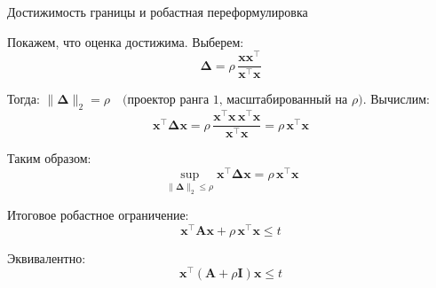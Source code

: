 \documentclass{beamer}
\begin{document}
\begin{frame}{Достижимость границы и робастная переформулировка}
	\begin{flushleft}
		
		Покажем, что оценка достижима. Выберем:
		\[
		\mathbf{\Delta} = \rho \, \frac{\mathbf{x}\mathbf{x}^\top}{\mathbf{x}^\top \mathbf{x}}
		\]
		
		Тогда: $\|\mathbf{\Delta}\|_2 = \rho
		\quad \text{(проектор ранга 1, масштабированный на } \rho \text{)}$. Вычислим:
		\[
		\mathbf{x}^\top \mathbf{\Delta} \mathbf{x}
		= \rho \, \frac{\mathbf{x}^\top \mathbf{x} \, \mathbf{x}^\top \mathbf{x}}{\mathbf{x}^\top \mathbf{x}}
		= \rho \, \mathbf{x}^\top \mathbf{x}
		\]
		
		
		Таким образом:
		\[
		\sup_{\|\mathbf{\Delta}\|_2 \le \rho} \mathbf{x}^\top \mathbf{\Delta} \mathbf{x} = \rho \, \mathbf{x}^\top \mathbf{x}
		\]
		
		
		Итоговое робастное ограничение:
		\[
		\mathbf{x}^\top \mathbf{A} \mathbf{x} + \rho \, \mathbf{x}^\top \mathbf{x} \le t
		\]
		
		
		Эквивалентно:
		\[
		\mathbf{x}^\top (\mathbf{A} + \rho \mathbf{I})\mathbf{x} \le t
		\]
		
	\end{flushleft}
\end{frame}


\myqrframe
\end{document}
